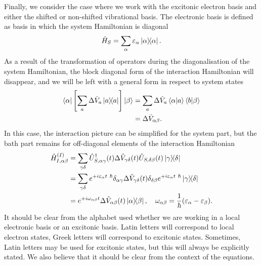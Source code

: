 Finally, we consider the case where we work with the excitonic electron basis and either the shifted or non-shifted vibrational basis. The electronic basis is defined as basis in which the system Hamiltonian is diagonal
\begin{equation}
    \begin{aligned}
    \hat{H}_S &= \sum_{\alpha} \varepsilon_\alpha \ketbra{\alpha}. \\
    \end{aligned}
\end{equation}
As a result of the transformation of operators during the diagonalisation of the system Hamiltonian, the block diagonal form of the interaction Hamiltonian will disappear, and we will be left with a general form in respect to system states
\begin{equation}
    \begin{aligned}
    \bra{\alpha}\left[ \sum_{a} \Delta \hat{V}_a \ketbra{a} \right]\ket{\beta} &= \sum_{a} \Delta \hat{V}_a \braket{\alpha}{a} \braket{b}{\beta}\\
    &=  \Delta \hat{V}_{\alpha \beta}. \\
    \end{aligned}
\end{equation}
In this case, the interaction picture can be simplified for the system part, but the bath part remains for off-diagonal elements of the interaction Hamiltonian
\begin{equation}
    \begin{aligned}
    \hat{H}_{I, \alpha \beta}^{(I)} &= \sum_{\gamma \delta} \hat{U}^\dagger_{S, \alpha \gamma}(t)\Delta \hat{V}_{\gamma \delta}(t)\hat{U}_{S, \delta \beta}(t) \ketbra{\gamma}{\delta} \\
    &= \sum_{\gamma \delta} e^{+i \varepsilon_{\alpha} t \ \hbar} \delta_{\alpha \gamma}\Delta \hat{V}_{\gamma \delta}(t) \delta_{\delta \beta} e^{+i \varepsilon_{\alpha} t \ \hbar} \ketbra{\gamma}{\delta} \\
    &= e^{+i \omega_{\alpha \beta} t} \Delta \hat{V}_{\alpha \beta}(t) \ketbra{\alpha}{\beta}, \quad \omega_{\alpha \beta} = \frac{1}{\hbar} (\varepsilon_{\alpha} - \varepsilon_{\beta}).
    \end{aligned}
\end{equation}
It should be clear from the alphabet used whether we are working in a local electronic basis or an excitonic basis. Latin letters will correspond to local electron states, Greek letters will correspond to excitonic states. Sometimes, Latin letters may be used for excitonic states, but this will always be explicitly stated. We also believe that it should be clear from the context of the equations.

